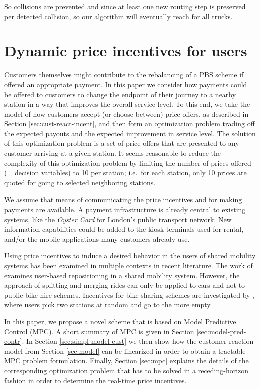 \documentclass{article}
\begin{document}
So collisions are prevented and since at least one new routing step is preserved
per detected collision, so our algorithm will eventually reach  for all
trucks.

\section{Dynamic price incentives for users}
\label{sec:pricing}

Customers themselves might contribute to the rebalancing of a PBS scheme if
offered an appropriate payment. In this paper we consider how payments could be
offered to customers to change the endpoint of their journey to a nearby station
in a way that improves the overall service level. To this end, we take the model
of how customers accept (or choose between) price offers, as described in
Section \ref{sec:cust-react-incent}, and then form an optimization problem
trading off the expected payouts and the expected improvement in service level.
The solution of this optimization problem is a set of price offers that are presented
to any customer arriving at a given station. It seems reasonable to reduce the
complexity of this optimization problem by limiting the number of prices offered
(= decision variables) to 10 per station; i.e.\ for each station, only 10 prices
are quoted for going to selected neighboring stations.

We assume that means of communicating the price incentives and for making
payments are available. A payment infrastructure is already central to existing
systems, like the \emph{Oyster Card} for London's public transport network. New
information capabilities could be added to the kiosk terminals used for rental,
and/or the mobile applications many customers already use.

Using price incentives to induce a desired behavior in the users of shared
mobility systems has been examined in multiple contexts in recent literature.
The work of \cite{barth2004} examines user-based repositioning in a shared
mobility system. However, the approach of splitting and merging rides can only
be applied to cars and not to public bike hire schemes. Incentives for bike
sharing schemes are investigated by \cite{fricker_incentives_2012}, where users
pick two stations at random and go to the more empty.

In this paper, we propose a novel scheme that is based on Model Predictive
Control (MPC). A short summary of MPC is given in Section
\ref{sec:model-pred-contr}. In Section \ref{sec:simpl-model-cust} we then
show how the customer reaction model from Section \ref{sec:model} can be
linearized in order to obtain a tractable MPC problem formulation. Finally,
Section \ref{sec:mpc} explains the details of the corresponding
optimization problem that has to be solved in a
receding-horizon fashion in order to determine the real-time price incentives.
\end{document}
